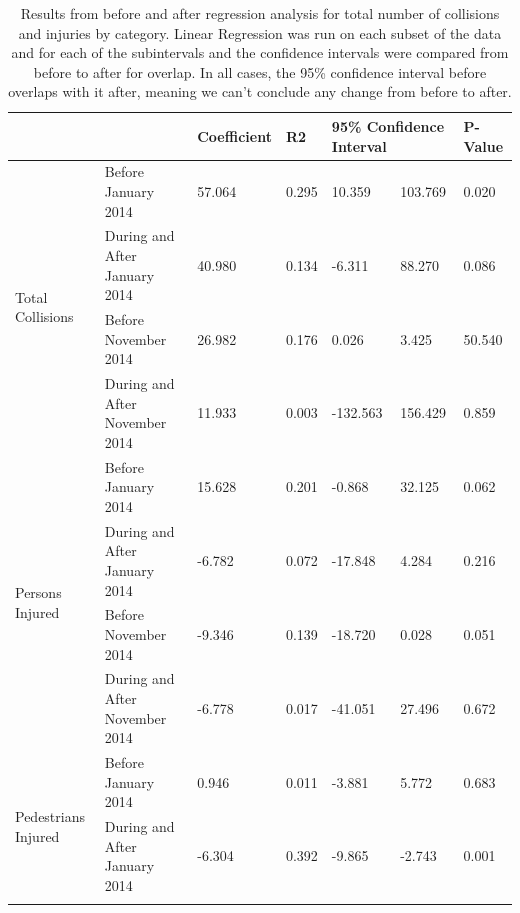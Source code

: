 \documentclass[10pt,journal,compsoc]{IEEEtran}
\begin{document}
\begin{table}[]
\centering
\caption{Results from before and after regression analysis for total number of collisions and injuries by category. Linear Regression was run on each subset of the data and for each of the subintervals and the confidence intervals were compared from before to after for overlap.  In all cases, the 95\% confidence interval before overlaps with it after, meaning we can't conclude any change from before to after. }
\label{tab:ana}
\begin{tabular}{|l|l|l|l|l|l|l|}
\hline
                                     &            & Coefficient & R2    & \multicolumn{2}{l|}{95\% Confidence Interval} & P-Value \\ \hline
\multirow{4}{*}{Total Collisions}    & Before January 2014 & 57.064      & 0.295 & 10.359                 & 103.769              & 0.020   \\ \cline{2-7} 
                                     & During and After January 2014  & 40.980      & 0.134 & -6.311                 & 88.270               & 0.086   \\ \cline{2-7} 
                                     & Before November 2014 & 26.982      & 0.176 & 0.026                  & 3.425                & 50.540  \\ \cline{2-7} 
                                     & During and After November 2014  & 11.933      & 0.003 & -132.563               & 156.429              & 0.859   \\ \hline
\multirow{4}{*}{Persons Injured}     & Before January 2014 & 15.628      & 0.201 & -0.868                 & 32.125               & 0.062   \\ \cline{2-7} 
                                     & During and After January 2014  & -6.782      & 0.072 & -17.848                & 4.284                & 0.216   \\ \cline{2-7} 
                                     & Before November 2014 & -9.346      & 0.139 & -18.720                & 0.028                & 0.051   \\ \cline{2-7} 
                                     & During and After November 2014  & -6.778      & 0.017 & -41.051                & 27.496               & 0.672   \\ \hline
\multirow{4}{*}{Pedestrians Injured} & Before January 2014 & 0.946       & 0.011 & -3.881                 & 5.772                & 0.683   \\ \cline{2-7} 
                                     & During and After January 2014  & -6.304      & 0.392 & -9.865                 & -2.743               & 0.001   \\ \cline{2-7} 

\end{tabular}
\end{table}
\end{document}
